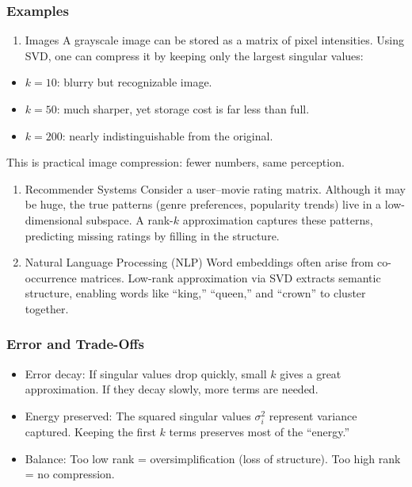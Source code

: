 \documentclass[
  letterpaper,
  DIV=11,
  numbers=noendperiod]{scrreprt}
\providecommand{\tightlist}{%
  \setlength{\itemsep}{0pt}\setlength{\parskip}{0pt}}
\begin{document}
\subsubsection{Examples}\label{examples-5}

\begin{enumerate}
\def\labelenumi{\arabic{enumi}.}
\tightlist
\item
  Images A grayscale image can be stored as a matrix of pixel
  intensities. Using SVD, one can compress it by keeping only the
  largest singular values:
\end{enumerate}

\begin{itemize}
\tightlist
\item
  \(k = 10\): blurry but recognizable image.
\item
  \(k = 50\): much sharper, yet storage cost is far less than full.
\item
  \(k = 200\): nearly indistinguishable from the original.
\end{itemize}

This is practical image compression: fewer numbers, same perception.

\begin{enumerate}
\def\labelenumi{\arabic{enumi}.}
\setcounter{enumi}{1}
\item
  Recommender Systems Consider a user--movie rating matrix. Although it
  may be huge, the true patterns (genre preferences, popularity trends)
  live in a low-dimensional subspace. A rank-\(k\) approximation
  captures these patterns, predicting missing ratings by filling in the
  structure.
\item
  Natural Language Processing (NLP) Word embeddings often arise from
  co-occurrence matrices. Low-rank approximation via SVD extracts
  semantic structure, enabling words like ``king,'' ``queen,'' and
  ``crown'' to cluster together.
\end{enumerate}

\subsubsection{Error and Trade-Offs}\label{error-and-trade-offs}

\begin{itemize}
\tightlist
\item
  Error decay: If singular values drop quickly, small \(k\) gives a
  great approximation. If they decay slowly, more terms are needed.
\item
  Energy preserved: The squared singular values \(\sigma_i^2\) represent
  variance captured. Keeping the first \(k\) terms preserves most of the
  ``energy.''
\item
  Balance: Too low rank = oversimplification (loss of structure). Too
  high rank = no compression.
\end{itemize}
\end{document}
